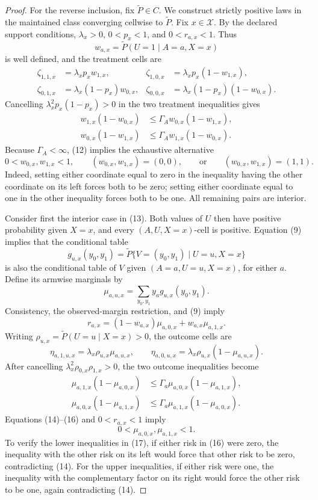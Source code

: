\documentclass{article}
\begin{document}
\begin{proof}
For the reverse inclusion, fix \(\widetilde P\in C\).  We construct strictly positive laws in the maintained class converging cellwise to \(\widetilde P\).  Fix \(x\in\mathcal X\).  By the declared support conditions, \(\lambda_x>0\), \(0<p_x<1\), and \(0<r_{a,x}<1\).  Thus
\[
w_{a,x}=\widetilde P(U=1\mid A=a,X=x)
\]
is well defined, and the treatment cells are
\[
\begin{aligned}
\zeta_{1,1,x}&=\lambda_xp_xw_{1,x},
&\zeta_{1,0,x}&=\lambda_xp_x(1-w_{1,x}),\\
\zeta_{0,1,x}&=\lambda_x(1-p_x)w_{0,x},
&\zeta_{0,0,x}&=\lambda_x(1-p_x)(1-w_{0,x}).
\end{aligned}                                             \tag{11}
\]
Cancelling \(\lambda_x^2p_x(1-p_x)>0\) in the two treatment inequalities gives
\[
\begin{aligned}
w_{1,x}(1-w_{0,x})
&\leq\Gamma_Aw_{0,x}(1-w_{1,x}),\\
w_{0,x}(1-w_{1,x})
&\leq\Gamma_Aw_{1,x}(1-w_{0,x}).
\end{aligned}                                             \tag{12}
\]
Because \(\Gamma_A<\infty\), (12) implies the exhaustive alternative
\[
0<w_{0,x},w_{1,x}<1,
\qquad (w_{0,x},w_{1,x})=(0,0),
\qquad\text{or}\qquad(w_{0,x},w_{1,x})=(1,1).            \tag{13}
\]
Indeed, setting either coordinate equal to zero in the inequality having the other coordinate on its left forces both to be zero; setting either coordinate equal to one in the other inequality forces both to be one.  All remaining pairs are interior.

Consider first the interior case in (13).  Both values of \(U\) then have positive probability given \(X=x\), and every \((A,U,X=x)\)-cell is positive.  Equation (9) implies that the conditional table
\[
g_{u,x}(y_0,y_1)
=\widetilde P\{V=(y_0,y_1)\mid U=u,X=x\}
\]
is also the conditional table of \(V\) given \((A=a,U=u,X=x)\), for either \(a\).  Define its armwise marginals by
\[
\mu_{a,u,x}=\sum_{y_0,y_1}y_a g_{u,x}(y_0,y_1).
\]
Consistency, the observed-margin restriction, and (9) imply
\[
r_{a,x}=(1-w_{a,x})\mu_{a,0,x}+w_{a,x}\mu_{a,1,x}.       \tag{14}
\]
Writing \(\rho_{u,x}=\widetilde P(U=u\mid X=x)>0\), the outcome cells are
\[
\eta_{a,1,u,x}=\lambda_x\rho_{u,x}\mu_{a,u,x},
\qquad
\eta_{a,0,u,x}=\lambda_x\rho_{u,x}(1-\mu_{a,u,x}).      \tag{15}
\]
After cancelling \(\lambda_x^2\rho_{0,x}\rho_{1,x}>0\), the two outcome inequalities become
\[
\begin{aligned}
\mu_{a,1,x}(1-\mu_{a,0,x})
&\leq\Gamma_a\mu_{a,0,x}(1-\mu_{a,1,x}),\\
\mu_{a,0,x}(1-\mu_{a,1,x})
&\leq\Gamma_a\mu_{a,1,x}(1-\mu_{a,0,x}).
\end{aligned}                                             \tag{16}
\]
Equations (14)--(16) and \(0<r_{a,x}<1\) imply
\[
0<\mu_{a,0,x},\mu_{a,1,x}<1.                             \tag{17}
\]
To verify the lower inequalities in (17), if either risk in (16) were zero, the inequality with the other risk on its left would force that other risk to be zero, contradicting (14).  For the upper inequalities, if either risk were one, the inequality with the complementary factor on its right would force the other risk to be one, again contradicting (14).


\end{proof}
\end{document}
